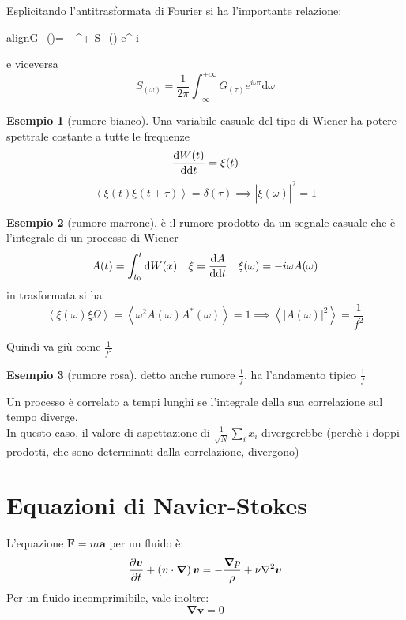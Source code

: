 \documentclass[a4paper,12pt]{article}
\renewcommand{\arg}[1]{_{(#1)}}
\newcommand{\boxedeq}[2]{\begin{empheq}[box={\fboxsep=6pt\fbox}]{align}\label{#1}#2\end{empheq}}
\theoremstyle{plain}
\renewcommand{\vec}[1]{{\boldsymbol{#1}}}
\theoremstyle{definition}
\newtheorem{exmp}{Esempio}[section]
\newcommand{\f}[2]{\frac{#1}{#2}}
\newcommand{\ave}[1]{\left\langle#1\right\rangle }
\renewcommand{\d}{\text{d}}
\theoremstyle{remark}
\begin{document}
Esplicitando l'antitrasformata di Fourier si ha l'importante relazione:
\boxedeq{Wiener}{G\arg{\tau}=\int_{-\infty}^{+\infty} S\arg{\omega} e^{-i \omega \tau}	\d\omega	}
e viceversa
\[S\arg{\omega}=\f{1}{2\pi}\int_{-\infty}^{+\infty} G\arg{\tau} e^{i \omega \tau}	\d\omega\]
\begin{exmp}[rumore bianco]
	Una variabile casuale del tipo di Wiener ha potere spettrale costante a tutte le frequenze
	\[\dv{ W(t)}{\d t}=\xi(t)\]
\[\ave{\xi(t)\xi(t+\tau)}=\delta(\tau)\implies|\tilde{\xi}(\omega)|^2=1\]

\end{exmp}
\begin{exmp}[rumore marrone]
è il rumore prodotto da un segnale casuale che è l'integrale di un processo di Wiener
\[A(t)=\int_{t_0}^t \d W(x) \quad \xi=\dv{A}{\d t} \quad \xi(\omega)=-i\omega A(\omega)\]
in trasformata si ha
\[\ave{\xi(\omega)\xi \Omega}=\ave{\omega^2 A(\omega)A^*(\omega)}=1\implies\ave{|A(\omega)|^2}=\f{1}{f^2}\]

Quindi va giù come  $\f{1}{f^2}$
\end{exmp}
\begin{exmp}[rumore rosa]
detto anche rumore $\f{1}{f}$, ha l'andamento tipico $\f{1}{f}$
	


\end{exmp}
Un processo è correlato a tempi lunghi se l'integrale della sua correlazione sul tempo diverge. \\
In questo caso, il valore di aspettazione di $\f{1}{\sqrt{N}}\sum_i x_i$ divergerebbe (perchè i doppi prodotti, che sono determinati dalla correlazione, divergono)


\section{Equazioni di Navier-Stokes}

L'equazione $\vec{F}=m\vec{a}$ per un fluido è:
\[\pdv{\vec{v}}{t}+\left(\vec{v}\cdot\vec{\nabla}\right)\vec{v}=-\f{\vec{\nabla} p}{\rho}+\nu \nabla^2 \vec{v}\]
Per un fluido incomprimibile, vale inoltre:
\[\vec{\nabla}\vec{v}=0\]
\end{document}
